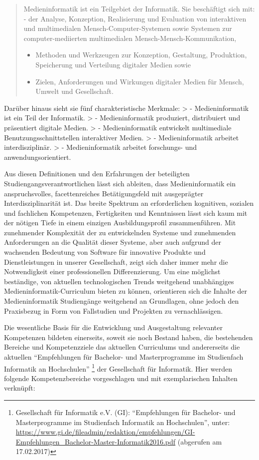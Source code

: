 \begin{quote}
Medieninformatik ist ein Teilgebiet der Informatik. Sie beschäftigt sich
mit: - der Analyse, Konzeption, Realisierung und Evaluation von
interaktiven und multimedialen Mensch-Computer-Systemen sowie Systemen
zur computer-mediierten multimedialen Mensch-Mensch-Kommunikation,

\begin{itemize}
\tightlist
\item
  Methoden und Werkzeugen zur Konzeption, Gestaltung, Produktion,
  Speicherung und Verteilung digitaler Medien sowie
\item
  Zielen, Anforderungen und Wirkungen digitaler Medien für Mensch,
  Umwelt und Gesellschaft.
\end{itemize}
\end{quote}

Darüber hinaus sieht sie fünf charakteristische Merkmale: \textgreater{}
- Medieninformatik ist ein Teil der Informatik. \textgreater{} -
Medieninformatik produziert, distribuiert und präsentiert digitale
Medien. \textgreater{} - Medieninformatik entwickelt multimediale
Benutzungsschnittstellen interaktiver Medien. \textgreater{} -
Medieninformatik arbeitet interdisziplinär. \textgreater{} -
Medieninformatik arbeitet forschungs- und anwendungsorientiert.

Aus diesen Definitionen und den Erfahrungen der beteiligten
Studiengangsverantwortlichen lässt sich ableiten, dass Medieninformatik
ein anspruchsvolles, facettenreiches Betätigungsfeld mit ausgeprägter
Interdisziplinarität ist. Das breite Spektrum an erforderlichen
kognitiven, sozialen und fachlichen Kompetenzen, Fertigkeiten und
Kenntnissen lässt sich kaum mit der nötigen Tiefe in einem einzigen
Ausbildungsprofil zusammenführen. Mit zunehmender Komplexität der zu
entwickelnden Systeme und zunehmenden Anforderungen an die Qualität
dieser Systeme, aber auch aufgrund der wachsenden Bedeutung von Software
für innovative Produkte und Dienstleistungen in unserer Gesellschaft,
zeigt sich daher immer mehr die Notwendigkeit einer professionellen
Differenzierung. Um eine möglichst beständige, von aktuellen
technologischen Trends weitgehend unabhängiges
Medieninformatik-Curriculum bieten zu können, orientieren sich die
Inhalte der Medieninformatik Studiengänge weitgehend an Grundlagen, ohne
jedoch den Praxisbezug in Form von Fallstudien und Projekten zu
vernachlässigen.

Die wesentliche Basis für die Entwicklung und Ausgestaltung relevanter
Kompetenzen bildeten einerseits, soweit sie noch Bestand haben, die
bestehenden Bereiche und Kompetenzziele das aktuellen Curriculums und
andererseits die aktuellen ``Empfehlungen für Bachelor- und
Masterprogramme im Studienfach Informatik an Hochschulen'' \footnote{Gesellschaft
  für Informatik e.V. (GI): ``Empfehlungen für Bachelor- und
  Masterprogramme im Studienfach Informatik an Hochschulen'', unter:
  \url{https://www.gi.de/fileadmin/redaktion/empfehlungen/GI-Empfehlungen\_Bachelor-Master-Informatik2016.pdf}
  (abgerufen am 17.02.2017)} der Gesellschaft für Informatik. Hier
werden folgende Kompetenzbereiche vorgeschlagen und mit exemplarischen
Inhalten verknüpft:

